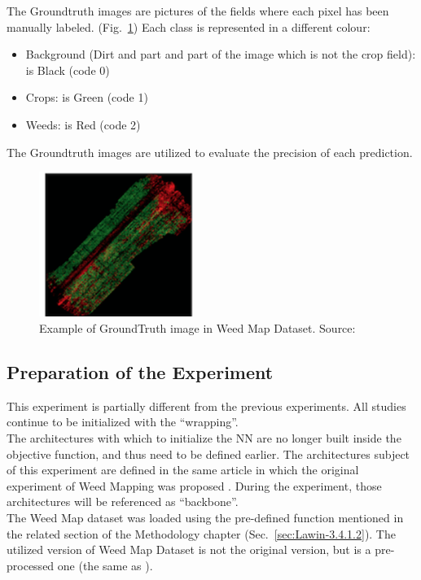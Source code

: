 The Groundtruth images are pictures of the fields where each pixel has been manually labeled. (Fig.~\ref{fig:figure-4.5.4})
Each class is represented in a different colour:
\begin{itemize}[itemsep=0.1cm]
	\item Background (Dirt and part and part of the image which is not the crop field): is Black (code 0)
	\item Crops: is Green (code 1)
	\item Weeds: is Red (code 2)
\end{itemize}
The Groundtruth images are utilized to evaluate the precision of each prediction.
\begin{figure}[t]
	\centering
	\includegraphics[width=5cm]{figures/figure-4.5.4.png}
	\caption[Example of GroundTruth in Weed Map Dataset]{Example of GroundTruth image in Weed Map Dataset. Source:~\cite{Tesi-2.1}}
	\label{fig:figure-4.5.4}
\end{figure}

\subsection{Preparation of the Experiment}

This experiment is partially different from the previous experiments. All studies continue to be initialized with the “wrapping”.
\\[0.3cm]The architectures with which to initialize the NN are no longer built inside the objective function, and thus need to be defined earlier. The architectures subject of this experiment are defined in the same article in which the original experiment of Weed Mapping was proposed \cite{WeedMap-PaperThesis}. During the experiment, those architectures will be referenced as “backbone”.
\\[0.3cm]The Weed Map dataset was loaded using the pre-defined function mentioned in the related section of the Methodology chapter (Sec.~\ref{sec:Lawin-3.4.1.2}). The utilized version of Weed Map Dataset is not the original version, but is a pre-processed one (the same as \cite{WeedMap-PaperThesis}).

